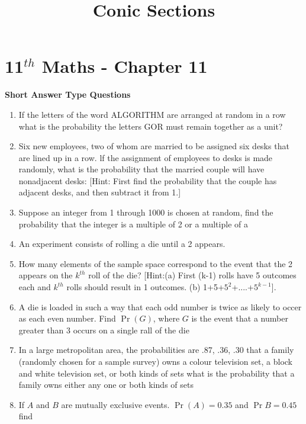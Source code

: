 \documentclass[12pt]{article}
\providecommand{\pr}[1]{\ensuremath{\Pr\left(#1\right)}}
\begin{document}
\begin{center}
\enlargethispage{-4cm}
\title{\textbf{Conic Sections}}
\date{\vspace{-5ex}} %
\maketitle
\end{center}
\setcounter{page}{1}
\section*{11$^{th}$ Maths - Chapter 11}
\textbf{Short Answer Type Questions}
\begin{enumerate}
\item If the letters of the word ALGORITHM are arranged at random in a row what is the probability the letters GOR must remain together as a unit?
\item Six new employees, two of whom are married to be assigned six desks that are lined up in a row. lf the assignment of employees to desks is made randomly, what is the probability that the married couple will have nonadjacent desks:
[Hint: First find the probability that the couple has adjacent desks, and then subtract it from 1.]
\item Suppose an integer from 1 through 1000 is chosen at random, find the probability that the integer is a multiple of 2 or a multiple of a
\item An experiment consists of rolling a die until a 2 appears.
\item How many elements of the sample space correspond to the event that the 2 appears on the $k^{th}$ roll of the die?
	[Hint:(a) First (k-1) rolls have 5 outcomes each and $k^{th}$ rolls should result in 1 outcomes. (b) 1+5+$5^2$+....+$5^{k-1}$].
\item A die is loaded in such a way that each odd number is twice as likely to occer as each even number. Find $\pr{G}$, where $G$ is the event that a number greater than 3 occurs on a  single rall of the die
\item In a large metropolitan area, the probabilities are .87, .36, .30 that a family (randomly chosen for a sample survey) owns a colour television set, a block and white television set, or both kinds of sets what is the probability that a family owns either any one or both kinds of sets
\item  If $A$ and $B$ are mutually exclusive events. $\pr{A}=0.35$ and $\Pr{B}=0.45$ find
\begin{enumerate}

\end{enumerate}
\end{enumerate}
\end{document}
